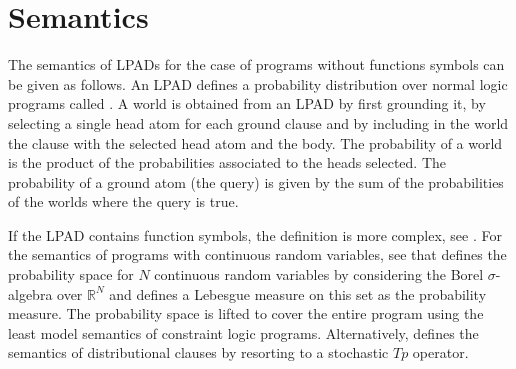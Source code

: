 \documentclass[letterpaper,10pt,english]{sphinxmanual}
\begin{document}
\begin{sphinxVerbatim}[commandchars=\\\{\}]
  \PYG{p}{[}\PYG{p}{]}
          
  

 
             
 

  
            
  
\end{sphinxVerbatim}


\chapter{Semantics}
\label{\detokenize{index:semantics}}
The semantics of LPADs for the case of programs without functions symbols can be given as follows.
An LPAD defines a probability distribution over normal logic programs called .
A world is obtained from an LPAD by first grounding it, by selecting a single head atom for each ground clause and by including in the world the clause with the selected head atom and the body.
The probability of a world is the product of the probabilities associated to the heads selected.
The probability of a ground atom (the query) is given by the sum of the probabilities of the worlds where the query is true.

If the LPAD contains function symbols, the definition is more complex, see .
For the semantics of programs with continuous random variables, see  that defines the probability space for \(N\) continuous random variables by considering the Borel \(\sigma\)-algebra over \(\mathbb{R}^N\) and defines a Lebesgue measure on this set as the probability measure.
The probability space is lifted to cover the entire program using the least model semantics of constraint logic programs.
Alternatively,  defines the semantics of distributional clauses by resorting to a stochastic \(Tp\) operator.
\end{document}
